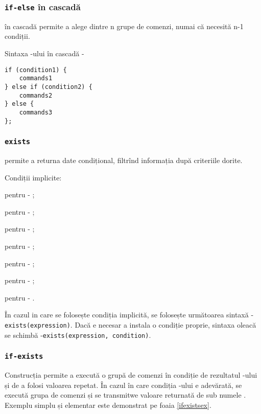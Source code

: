 \subsubsection{\lstinline|if-else| în cascadă}

 în cascadă permite a alege dintre n grupe de comenzi, numai că necesită n-1 condiții.

Sintaxa -ului în cascadă -
\begin{lstlisting}[numbers=none]
if (condition1) {
	commands1
} else if (condition2) {
	commands2
} else {
	commands3
};
\end{lstlisting}

\subsubsection{\lstinline|exists|}

 permite a returna date condițional, filtrînd informația după criteriile dorite.

Condiții implicite:
\begin{icItems}
\item
	pentru \bool{} - ;
\item
	pentru \integer{} - ;
\item
	pentru \double{} - ;
\item
	pentru \str{} - ;
\item
	pentru \listtype{} - ;
\item
	pentru \set{} - ;
\item
	pentru \element{} - .
\end{icItems}

În cazul in care se folosește condiția implicită, se folosește următoarea sintaxă - \lstinline|exists(expression)|.
Dacă e necesar a instala o condiție proprie, sintaxa oleacă se schimbă -\lstinline|exists(expression, condition)|.

\subsubsection{\lstinline|if-exists|}

Construcția  permite a execută o grupă de comenzi în condiție de rezultatul -ului și de a folosi valoarea repetat. În cazul în care condiția -ului e adevărată, se execută grupa de comenzi și se transmitwe valoare returnată de  sub numele .
Exemplu simplu și elementar este demonstrat pe foaia \ref{ifexistsex}.

